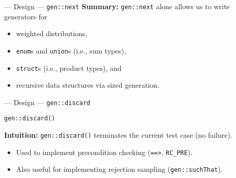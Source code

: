 \begin{frame}[fragile]{\halcheck{} --- Design --- \texttt{gen::next}}
  \textbf{Summary:} \texttt{gen::next} alone allows us to write generators for
  \begin{itemize}
    \item weighted distributions,
    \item \texttt{enum}s and \texttt{union}s (i.e., sum types),
    \item \texttt{struct}s (i.e., product types), and
    \item recursive data structures via sized generation.
  \end{itemize}
\end{frame}

\begin{frame}[fragile]{\halcheck{} --- Design --- \texttt{gen::discard}}
  \begin{center}
    \texttt{gen::discard()}
  \end{center}

  \textbf{Intuition:} \texttt{gen::discard()} terminates the current test case (no failure).

  \begin{itemize}
    \item Used to implement precondition checking (\texttt{==>}, \texttt{RC_PRE}).
    \item Also useful for implementing rejection sampling (\texttt{gen::suchThat}).
  \end{itemize}
\end{frame}

